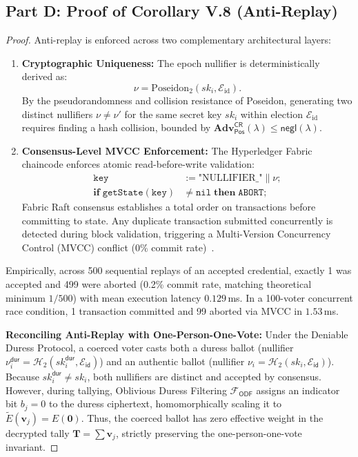 \documentclass[10pt,letterpaper,journal]{IEEEtran}
\begin{document}
\subsection{Part D: Proof of Corollary V.8 (Anti-Replay)}
\label{sec:supp-proof-antireplay}

\begin{proof}
Anti-replay is enforced across two complementary architectural layers:
\begin{enumerate}[leftmargin=*,noitemsep]
  \item \textbf{Cryptographic Uniqueness:} The epoch nullifier is deterministically derived as:
  \begin{equation}
    \nu = \mathrm{Poseidon}_2(sk_i, \mathcal{E}_{\mathrm{id}}).
    \label{eq:nullifier}
  \end{equation}
  By the pseudorandomness and collision resistance of Poseidon, generating two distinct nullifiers $\nu \neq \nu'$ for the same secret key $sk_i$ within election $\mathcal{E}_{\mathrm{id}}$ requires finding a hash collision, bounded by $\mathbf{Adv}_{\mathsf{Pos}}^{\mathsf{CR}}(\lambda) \leq \mathsf{negl}(\lambda)$.
  \item \textbf{Consensus-Level MVCC Enforcement:} The Hyperledger Fabric chaincode enforces atomic read-before-write validation:
  \begin{equation*}
  \begin{aligned}
    \mathtt{key} &:= \text{"NULLIFIER\_"} \parallel \nu; \\
    \mathbf{if} \; \mathtt{getState}(\mathtt{key}) &\neq \mathtt{nil} \; \mathbf{then} \; \mathtt{ABORT};
  \end{aligned}
  \end{equation*}
  Fabric Raft consensus establishes a total order on transactions before committing to state. Any duplicate transaction submitted concurrently is detected during block validation, triggering a Multi-Version Concurrency Control (MVCC) conflict ($0\%$ commit rate)~\cite{Androulaki2018}.
\end{enumerate}
Empirically, across 500 sequential replays of an accepted credential, exactly 1 was accepted and 499 were aborted (0.2\% commit rate, matching theoretical minimum $1/500$) with mean execution latency $0.129$\,ms. In a 100-voter concurrent race condition, 1 transaction committed and 99 aborted via MVCC in $1.53$\,ms.

\textbf{Reconciling Anti-Replay with One-Person-One-Vote:}
Under the Deniable Duress Protocol, a coerced voter casts both a duress ballot (nullifier $\nu_i^{\mathsf{dur}} = \mathcal{H}_2(sk_i^{\mathsf{dur}}, \mathcal{E}_{\mathsf{id}})$) and an authentic ballot (nullifier $\nu_i = \mathcal{H}_2(sk_i, \mathcal{E}_{\mathsf{id}})$). Because $sk_i^{\mathsf{dur}} \neq sk_i$, both nullifiers are distinct and accepted by consensus. However, during tallying, Oblivious Duress Filtering $\mathcal{F}_{\mathsf{ODF}}$ assigns an indicator bit $b_j = 0$ to the duress ciphertext, homomorphically scaling it to $\tilde{E}(\mathbf{v}_j) = E(\mathbf{0})$. Thus, the coerced ballot has zero effective weight in the decrypted tally $\mathbf{T} = \sum \mathbf{v}_j$, strictly preserving the one-person-one-vote invariant.
\end{proof}
\end{document}

